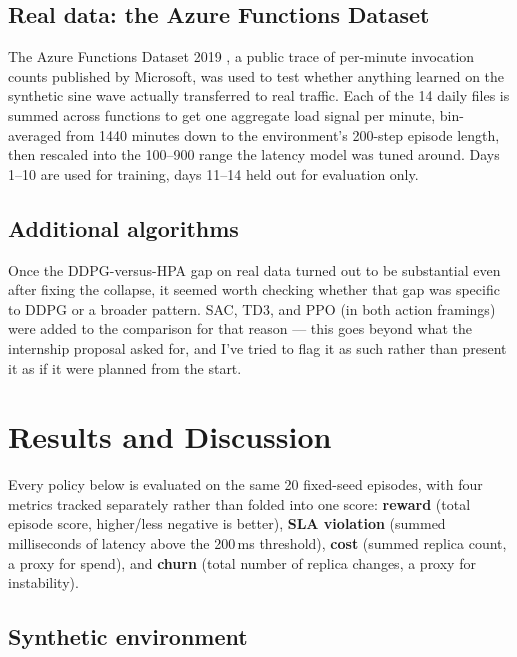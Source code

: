 \documentclass{rapportINPTCLOUD}
\begin{document}
\section{Real data: the Azure Functions Dataset}

The Azure Functions Dataset 2019 \cite{azurefunctions}, a public trace of per-minute invocation counts published by Microsoft, was used to test whether anything learned on the synthetic sine wave actually transferred to real traffic. Each of the 14 daily files is summed across functions to get one aggregate load signal per minute, bin-averaged from 1440 minutes down to the environment's 200-step episode length, then rescaled into the 100--900 range the latency model was tuned around. Days 1--10 are used for training, days 11--14 held out for evaluation only.

\section{Additional algorithms}

Once the DDPG-versus-HPA gap on real data turned out to be substantial even after fixing the collapse, it seemed worth checking whether that gap was specific to DDPG or a broader pattern. SAC, TD3, and PPO (in both action framings) were added to the comparison for that reason — this goes beyond what the internship proposal asked for, and I've tried to flag it as such rather than present it as if it were planned from the start.

\chapter{Results and Discussion}
\label{chap:results}

Every policy below is evaluated on the same 20 fixed-seed episodes, with four metrics tracked separately rather than folded into one score: \textbf{reward} (total episode score, higher/less negative is better), \textbf{SLA violation} (summed milliseconds of latency above the 200\,ms threshold), \textbf{cost} (summed replica count, a proxy for spend), and \textbf{churn} (total number of replica changes, a proxy for instability).

\section{Synthetic environment}
\end{document}
